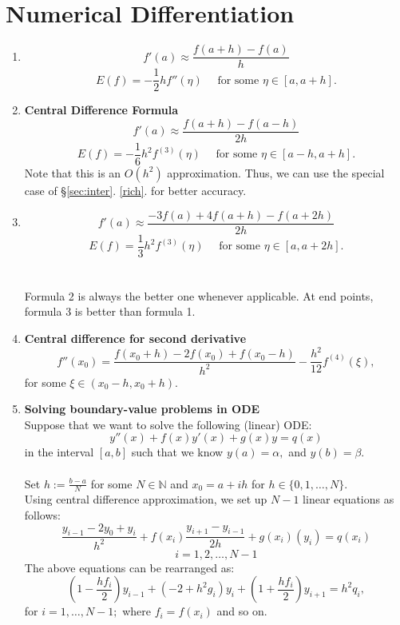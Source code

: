 \documentclass{article}
\begin{document}
\section{Numerical Differentiation}
\begin{enumerate} 
	\itemsep1em
	\item \[f'(a) \approx \frac{f(a + h) - f(a)}{h}\]
	\[E(f) = -\frac{1}{2}hf''(\eta) \quad \text{ for some }\eta\in[a, a+h].\]
	\item \textbf{Central Difference Formula}\\
	\[f'(a) \approx \frac{f(a + h) - f(a-h)}{2h}\]
	\[E(f) = -\frac{1}{6}h^2f^{(3)}(\eta) \quad \text{ for some }\eta\in[a-h, a+h].\]
	Note that this is an $O(h^2)$ approximation. Thus, we can use the special case of \S\ref{sec:inter}. \ref{rich}. for better accuracy.
	\item \[f'(a) \approx \frac{-3f(a) + 4f(a + h) - f(a + 2h)}{2h}\]
	\[E(f) = \frac{1}{3}h^2f^{(3)}(\eta) \quad \text{ for some }\eta\in[a, a+2h].\]\\
	\\
	Formula 2 is always the better one whenever applicable. At end points, formula 3 is better than formula 1.
	\item \textbf{Central difference for second derivative}\\
	\[f''(x_0) = \frac{f(x_0 + h) - 2f(x_0) + f(x_0 - h)}{h^2} - \frac{h^2}{12}f^{(4)}(\xi),\]
	for some $\xi \in (x_0 - h, x_0 + h).$
	\item \textbf{Solving boundary-value problems in ODE}\\
	Suppose that we want to solve the following (linear) ODE:
	\[y''(x) + f(x)y'(x) + g(x)y = q(x)\]
	in the interval $[a, b]$ such that we know $y(a) = \alpha,$ and $y(b) = \beta.$ \\~\\
	Set $h := \frac{b - a}{N}$ for some $N \in \mathbb{N}$ and $x_0 = a + ih$ for $h \in \{0, 1, \ldots, N\}.$\\
	Using central difference approximation, we set up $N-1$ linear equations as follows:
	\[\frac{y_{i-1} - 2y_0 + y_i}{h^2} + f(x_i)\frac{y_{i+1} - y_{i-1}}{2h} + g(x_i)(y_i) = q(x_i)\]
	\[i = 1, 2, \ldots, N-1\]
	The above equations can be rearranged as:
	\[\left(1 - \frac{hf_i}{2}\right)y_{i-1} + (-2 + h^2g_i)y_i + \left(1 + \frac{hf_i}{2}\right)y_{i+1} = h^2q_i,\]
	for $i = 1, \ldots, N-1;$ where $f_i = f(x_i)$ and so on.\\
\end{enumerate}
\end{document}

